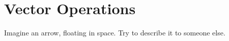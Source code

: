  \section{Vector Operations}
Imagine an arrow, floating in space. Try to describe it to someone else.
